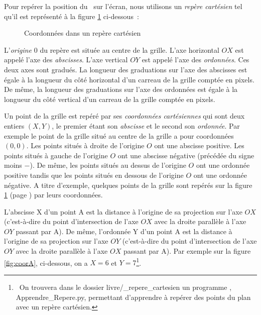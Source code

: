 Pour repérer la position du \robot\ sur l'écran, nous utilisons un {\em repère cartésien}
tel qu'il est représenté à la figure \ref{fig:repcar} ci-dessous~:

\begin{figure}[htbp]
 \caption{Coordonnées dans un repère cartésien}\label{fig:repcar}
\end{figure}

L'{\em origine\/} $0$ du repère est située au centre de la grille. L'axe horizontal $OX$ est 
appelé l'axe des {\em abscisses\/}. L'axe vertical $OY$ est 
appelé l'axe des {\em ordonnées\/}. Ces deux axes sont gradués. La longueur des
graduations sur l'axe des abscisses est égale à la longueur du côté horizontal d'un carreau 
 de la grille comptée en pixels. De même, la longueur des
graduations sur l'axe des ordonnées est égale à la longueur du côté vertical d'un carreau
de la grille comptée en pixels. 

Un point de la grille est repéré par ses {\em  coordonnées cartésiennes} qui sont
deux entiers $(X, Y)$, le premier étant son {\em abscisse} et le second son {\em ordonnée}. Par exemple le 
point de la grille situé au centre de la grille a pour coordonnées $(0, 0)$. Les points situés
à droite de l'origine $O$ ont une abscisse positive. Les points situés
à gauche de l'origine $O$ ont une abscisse négative (précédée du signe moins $-$). 
De même, les points situés au dessus
de l'origine $O$ ont une ordonnée positive tandis que les points situés
en dessous de l'origine $O$ ont une ordonnée négative.  A titre d'exemple, quelques points de 
la grille sont repérés sur la figure \ref{fig:repcar}  (page \pageref{fig:repcar}) par leurs 
coordonnées.  

L'abscisse X d'un point A est la distance à l'origine de sa projection sur l'axe $OX$
(c'est-à-dire du point d'intersection
de l'axe $OX$ avec la droite parallèle à l'axe $OY$ passant par A). De même, l'ordonnée Y d'un point 
A est la distance à l'origine de sa projection sur l'axe $OY$
(c'est-à-dire du point d'intersection
de l'axe $OY$ avec la droite parallèle à l'axe $OX$ passant par A). Par exemple sur la figure
\ref{fig:coorA}, 
ci-dessous,
on a $X = 6$ et $Y = 7$\footnote{\ On trouvera dans le dossier {\idt livre/\_repere\_cartesien}
un programme \python, {\idt Apprendre\_Repere.py}, permettant d'apprendre à repérer des points du plan avec
un repère cartésien.}.

